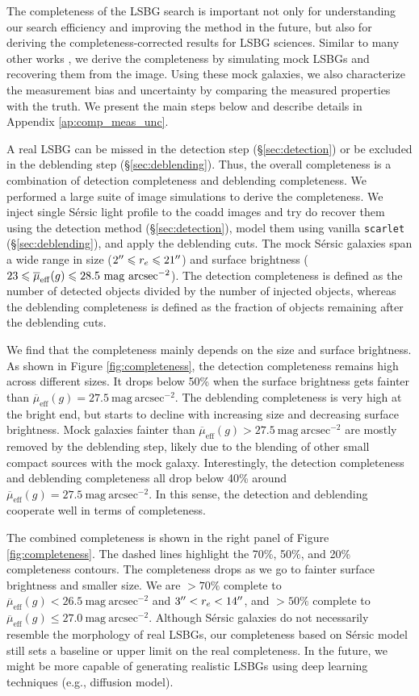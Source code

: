 \documentclass[twocolumn,astrosymb,twocolappendix]{aastex631}
\newcommand{\sbunit}{\mathrm{mag\ arcsec}^{-2}}
\newcommand{\sbeff}{\overline{\mu}_{\mathrm{eff}}(g)}
\newcommand{\code}[1]{\texttt{#1}}
\newcommand{\sersic}{S\'ersic}
\begin{document}
\begin{CJK*}{UTF8}{gbsn}
The completeness of the LSBG search is important not only for understanding our search efficiency and improving the method in the future, but also for deriving the completeness-corrected results for LSBG sciences. Similar to many other works \citep[e.g.,][]{vdBurg2017,Zaritsky2021,CarlstenELVES2022,Greene2022}, we derive the completeness by simulating mock LSBGs and recovering them from the image. Using these mock galaxies, we also characterize the measurement bias and uncertainty by comparing the measured properties with the truth. We present the main steps below and describe details in Appendix \ref{ap:comp_meas_unc}.

A real LSBG can be missed in the detection step (\S \ref{sec:detection}) or be excluded in the deblending step (\S \ref{sec:deblending}). Thus, the overall completeness is a combination of detection completeness and deblending completeness. We performed a large suite of image simulations to derive the completeness. We inject single \sersic{} light profile \citep{Sersic1963} to the coadd images and try do recover them using the detection method (\S\ref{sec:detection}), model them using vanilla \code{scarlet} (\S\ref{sec:deblending}), and apply the deblending cuts. The mock \sersic{} galaxies span a wide range in size ($2\mbox{$^{\prime\prime}$} \leqslant r_{e} \leqslant 21\mbox{$^{\prime\prime}$}$) and surface brightness ($23 \leqslant \overline{\mu}_{\rm eff}(g) \leqslant 28.5\ \mathrm{mag\ arcsec^{-2}}$). The detection completeness is defined as the number of detected objects divided by the number of injected objects, whereas the deblending completeness is defined as the fraction of objects remaining after the deblending cuts. 

We find that the completeness mainly depends on the size and surface brightness. As shown in Figure \ref{fig:completeness}, the detection completeness remains high across different sizes. It drops below 50\% when the surface brightness gets fainter than $\sbeff = 27.5\ \sbunit$. The deblending completeness is very high at the bright end, but starts to decline with increasing size and decreasing surface brightness. Mock galaxies fainter than $\sbeff > 27.5\ \sbunit$ are mostly removed by the deblending step, likely due to the blending of other small compact sources with the mock galaxy. Interestingly, the detection completeness and deblending completeness all drop below 40\% around $\sbeff=27.5\ \sbunit$. In this sense, the detection and deblending cooperate well in terms of completeness. 

The combined completeness is shown in the right panel of Figure \ref{fig:completeness}. The dashed lines highlight the 70\%, 50\%, and 20\% completeness contours. The completeness drops as we go to fainter surface brightness and smaller size. We are $>70\%$ complete to $\sbeff < 26.5\ \sbunit$ and $3\mbox{$^{\prime\prime}$} < r_e < 14\mbox{$^{\prime\prime}$}$, and $>50\%$ complete to $\sbeff \leqslant 27.0\ \sbunit$. Although \sersic{} galaxies do not necessarily resemble the morphology of real LSBGs, our completeness based on \sersic{} model still sets a baseline or upper limit on the real completeness. In the future, we might be more capable of generating realistic LSBGs using deep learning techniques (e.g., diffusion model). 


\end{CJK*}
\end{document}
